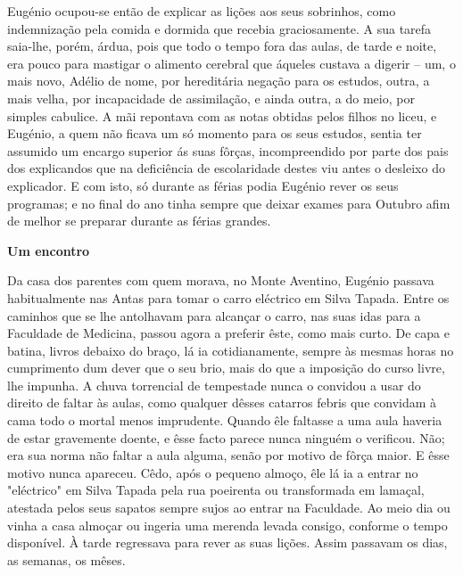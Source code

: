 \documentclass[9pt]{article}
\begin{document}
Eugé\-nio ocupou-se então de explicar as li\-ções aos seus sobrinhos,
como indemniza\-ção pela comida e dormida que recebia graciosamente. A sua
tarefa saia-\-lhe, porém, árdua, pois que todo o tempo fora das aulas, de tarde e noite, era pouco para mastigar o alimento cerebral que áqueles custava a digerir -- um, o mais novo, Adélio de nome, por hereditária nega\-ção
para os estudos, outra, a mais ve\-lha, por incapacidade de assimila\-ção, e
ainda outra, a do meio, por simples cabulice. A mãi repontava com as notas
obtidas pelos fi\-lhos no liceu, e Eugé\-nio, a quem não fi\-cava um só momento
para os seus estudos, sentia ter assumido um encargo superior ás suas
fôrças, incompreendido por parte dos pais dos explicandos que na deficiência de escolaridade destes viu antes o desleixo do explicador. E com
isto, só durante as férias podia Eugé\-nio rever os seus programas; e no
final do ano tinha sempre que deixar exames para Outubro afim de me\-lhor
se preparar durante as férias gran\-des.

\begin{center}\bf\large Um encontro\end{center}

Da  casa dos parentes com quem morava, no Monte Aventino,
Eugé\-nio passava habitualmente nas Antas para tomar o carro eléctrico em
Silva Tapada.
Entre os caminhos que se lhe anto\-lhavam para alcan\-çar o carro,
nas suas idas para a Faculdade de Medicina,
passou agora a preferir êste, como mais curto. De capa e batina, livros
debaixo do braço, lá ia cotidianamente, sempre às mesmas horas no cumprimento dum dever que o seu brio, mais do que a imposi\-ção do curso livre, lhe impunha. A chuva torrencial de tempestade nunca o convidou a
usar do direito de faltar às aulas, como qualquer dêsses catarros febris
que convidam à cama todo o mortal menos imprudente. Quando êle faltasse a uma aula haveria de estar gravemente doente, e êsse facto parece
nunca nin\-guém o verificou. Não; era sua norma não faltar a aula alguma, senão por motivo de fôrça maior. E êsse motivo nunca apareceu. Cêdo, após o pequeno almoço, êle lá ia a entrar no "eléctrico" em Silva Tapada pela rua poeirenta ou transformada em lamaçal, atestada pelos seus
sapatos sempre sujos ao entrar na Faculdade. Ao meio dia ou vinha a
casa almoçar ou ingeria uma merenda levada consigo, conforme o tempo
disponível. À tarde regressava para rever as suas li\-ções. Assim
passavam os dias, as semanas, os mêses.
\end{document}
